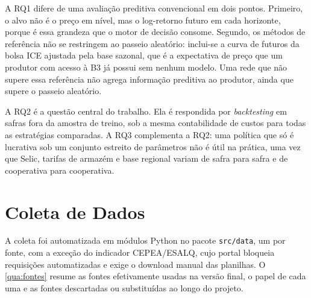A RQ1 difere de uma avaliação preditiva convencional em dois pontos. Primeiro, o alvo não é o preço em nível, mas o log-retorno futuro em cada horizonte, porque é essa grandeza que o motor de decisão consome. Segundo, os métodos de referência não se restringem ao passeio aleatório: inclui-se a curva de futuros da bolsa ICE ajustada pela base sazonal, que é a expectativa de preço que um produtor com acesso à B3 já possui sem nenhum modelo. Uma rede que não supere essa referência não agrega informação preditiva ao produtor, ainda que supere o passeio aleatório.

A RQ2 é a questão central do trabalho. Ela é respondida por \textit{backtesting} em safras fora da amostra de treino, sob a mesma contabilidade de custos para todas as estratégias comparadas. A RQ3 complementa a RQ2: uma política que só é lucrativa sob um conjunto estreito de parâmetros não é útil na prática, uma vez que Selic, tarifas de armazém e base regional variam de safra para safra e de cooperativa para cooperativa.

\section{Coleta de Dados}\label{sec2:coleta}

A coleta foi automatizada em módulos Python no pacote \texttt{src/data}, um por fonte, com a exceção do indicador CEPEA/ESALQ, cujo portal bloqueia requisições automatizadas e exige o download manual das planilhas. O \autoref{qua:fontes} resume as fontes efetivamente usadas na versão final, o papel de cada uma e as fontes descartadas ou substituídas ao longo do projeto.


